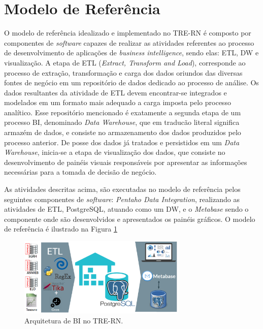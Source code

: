 \section{Modelo de Referência}
O modelo de referência idealizado e implementado no TRE-RN é composto por componentes de \textit{software} capazes de realizar as atividades referentes ao processo de desenvolvimento de aplicações de \textit{business intelligence}, sendo elas: ETL, DW e visualização.
A etapa de ETL (\textit{Extract, Transform and Load}), corresponde ao processo de extração, transformação e carga dos dados oriundos das diversas fontes de negócio em um repositório de dados dedicado ao processo de análise. Os dados resultantes da atividade de ETL devem encontrar-se integrados e modelados em um formato mais adequado a carga imposta pelo processo analítico. 
Esse repositório mencionado é exatamente a segunda etapa de um processo BI, denominado \textit{Data Warehouse}, que em traducão literal significa armazém de dados, e consiste no armazenamento dos dados produzidos pelo processo anterior.
De posse dos dados já tratados e persistidos em um \textit{Data Warehouse}, inicia-se a etapa de visualização dos dados, que consiste no desenvolvimento de painéis visuais responsáveis por apresentar as informações necessárias para a tomada de decisão de negócio.

As atividades descritas acima, são executadas no modelo de referência pelos seguintes componentes de \textit{software}: \textit{Pentaho Data Integration}, realizando as atividades de ETL, PostgreSQL, atuando como um DW, e o \textit{Metabase} sendo o componente onde são desenvolvidos e apresentados os painéis gráficos. O modelo de referência é ilustrado na Figura \ref{fig:modelo_referencia}

\begin{figure}[htp]
    \centering
    \includegraphics[width=8cm]{Imagens/Arq_TRE}
    \caption{Arquitetura de BI no TRE-RN.}
    \label{fig:modelo_referencia}
\end{figure}

